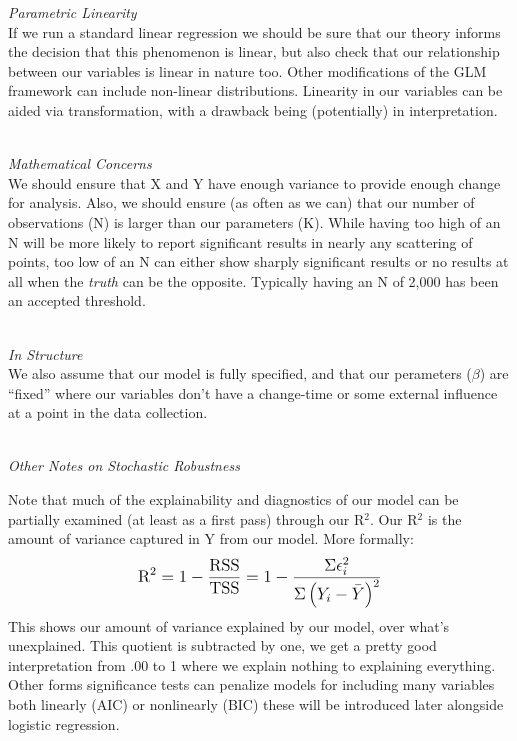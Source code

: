 \documentclass[12pt]{article}\usepackage[]{graphicx}\usepackage[]{color}
\begin{document}
\begin{flushleft}
\setlength{\parindent}{1cm} %

\noindent \textit{Parametric Linearity}\\
If we run a standard linear regression we should be sure that our theory informs the decision that this phenomenon is linear, but also check that our relationship between our variables is linear in nature too. Other modifications of the GLM framework can include non-linear distributions. Linearity in our variables can be aided via transformation, with a drawback being (potentially) in interpretation.

\hfill \\
\noindent \textit{Mathematical Concerns}\\
We should ensure that X and Y have enough variance to provide enough change for analysis. Also, we should ensure (as often as we can) that our number of observations (N) is larger than our parameters (K). While having too high of an N will be more likely to report significant results in nearly any scattering of points, too low of an N can either show sharply significant results or no results at all when the \textit{truth} can be the opposite. Typically having an N of 2,000 has been an accepted threshold.

\hfill \\
\noindent \textit{In Structure}\\
We also assume that our model is fully specified, and that our perameters ($\beta$) are ``fixed'' where our variables don't have a change-time or some external influence at a point in the data collection.

\hfill \\
\noindent \textit{Other Notes on Stochastic Robustness}

Note that much of the explainability and diagnostics of our model can be partially examined (at least as a first pass) through our R$^2$. Our R$^2$ is the amount of variance captured in Y from our model. More formally:
\begin{equation}
\mathlarger{ \text{R}^2 = 1 - \frac{\text{RSS}}{\text{TSS}} = 1- \frac{\Sigma \epsilon^{2}_i}{\Sigma\left(Y_i - \bar{Y}\right)^2} }
\end{equation}
This shows our amount of variance explained by our model, over what's unexplained. This quotient is subtracted by one, we get a pretty good interpretation from .00 to 1 where we explain nothing to explaining everything. Other forms significance tests can penalize models for including many variables both linearly (AIC) or nonlinearly (BIC) these will be introduced later alongside logistic regression.


\end{flushleft}
\end{document}
